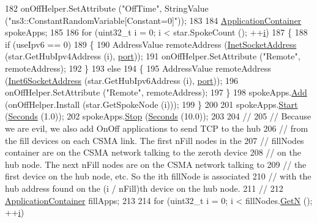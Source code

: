 \begin{DoxyCode}
182   onOffHelper.SetAttribute (\textcolor{stringliteral}{"OffTime"}, StringValue (\textcolor{stringliteral}{"ns3::ConstantRandomVariable[Constant=0]"}));
183 
184   \hyperlink{classns3_1_1ApplicationContainer}{ApplicationContainer} spokeApps;
185 
186   \textcolor{keywordflow}{for} (uint32\_t i = 0; i < star.SpokeCount (); ++\hyperlink{bernuolliDistribution_8m_a6f6ccfcf58b31cb6412107d9d5281426}{i})
187     \{
188       \textcolor{keywordflow}{if} (useIpv6 == 0)
189         \{
190           AddressValue remoteAddress (\hyperlink{classns3_1_1InetSocketAddress}{InetSocketAddress} (star.GetHubIpv4Address (i), 
      \hyperlink{dsdv-manet_8cc_a8e0798404bf2cf5dabb84c5ba9a4f236}{port}));
191           onOffHelper.SetAttribute (\textcolor{stringliteral}{"Remote"}, remoteAddress);
192         \}
193       \textcolor{keywordflow}{else}
194         \{
195           AddressValue remoteAddress (\hyperlink{classns3_1_1Inet6SocketAddress}{Inet6SocketAddress} (star.GetHubIpv6Address (i), 
      \hyperlink{dsdv-manet_8cc_a8e0798404bf2cf5dabb84c5ba9a4f236}{port}));
196           onOffHelper.SetAttribute (\textcolor{stringliteral}{"Remote"}, remoteAddress);
197         \}
198       spokeApps.\hyperlink{classns3_1_1ApplicationContainer_ad09ab1a1ad5849d518d5f4c262e38152}{Add} (onOffHelper.Install (star.GetSpokeNode (i)));
199     \}
200 
201   spokeApps.\hyperlink{classns3_1_1ApplicationContainer_a8eff87926507020bbe3e1390358a54a7}{Start} (\hyperlink{group__timecivil_ga33c34b816f8ff6628e33d5c8e9713b9e}{Seconds} (1.0));
202   spokeApps.\hyperlink{classns3_1_1ApplicationContainer_adfc52f9aa4020c8714679b00bbb9ddb3}{Stop} (\hyperlink{group__timecivil_ga33c34b816f8ff6628e33d5c8e9713b9e}{Seconds} (10.0));
203 
204   \textcolor{comment}{//}
205   \textcolor{comment}{// Because we are evil, we also add OnOff applications to send TCP to the hub }
206   \textcolor{comment}{// from the fill devices on each CSMA link.  The first nFill nodes in the }
207   \textcolor{comment}{// fillNodes container are on the CSMA network talking to the zeroth device}
208   \textcolor{comment}{// on the hub node.  The next nFill nodes are on the CSMA network talking to}
209   \textcolor{comment}{// the first device on the hub node, etc.  So the ith fillNode is associated}
210   \textcolor{comment}{// with the hub address found on the (i / nFill)th device on the hub node.}
211   \textcolor{comment}{//}
212   \hyperlink{classns3_1_1ApplicationContainer}{ApplicationContainer} fillApps;
213 
214   \textcolor{keywordflow}{for} (uint32\_t i = 0; i < fillNodes.\hyperlink{classns3_1_1NodeContainer_aed647ac56d0407a7706aba02eb44b951}{GetN} (); ++\hyperlink{bernuolliDistribution_8m_a6f6ccfcf58b31cb6412107d9d5281426}{i})

\end{DoxyCode}
